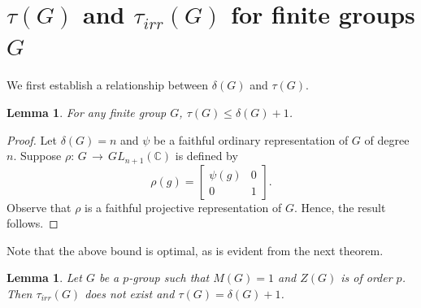 \documentclass[a4paper,11pt]{amsart}
\numberwithin{equation}{section}
\numberwithin{equation}{subsection}
\newtheorem{lemma}[theorem]{Lemma}
\begin{document}
	\section{$\tau(G)$ and $\tau_{irr}(G)$ for finite groups $G$} \label{emdedding degree} We first establish a relationship between $\delta(G)$ and $\tau(G)$. 
	
	
	\begin{lemma} \label{relation}
		For any finite group $G$, $\tau(G) \le \delta(G)+ 1$.
	\end{lemma}
	
	\begin{proof} Let $\delta(G)= n$ and $\psi$ be a faithful ordinary representation of $G$ of degree $n$. 
		Suppose $\rho$: $G\,\to\,GL_{n+1}(\mathbb{C})$ is defined by \[\rho(g)=
		\begin{bmatrix}
			\psi(g) & 0 \\
			0 &  1
		\end{bmatrix}.
		\]
		Observe that $\rho$ is a faithful projective representation of $G$. Hence, the result follows.
	\end{proof}
	Note that the above bound is optimal, as is evident from the next theorem. 
	\begin{lemma} \label{group with cyclic centre of order p}
		Let $G$ be a $p$-group such that $M(G)= 1$ and $Z(G)$ is of order $p$. Then $\tau_{irr}(G)$ does not exist and $\tau(G)= \delta(G)+1$.
	\end{lemma}
	
\end{document}
